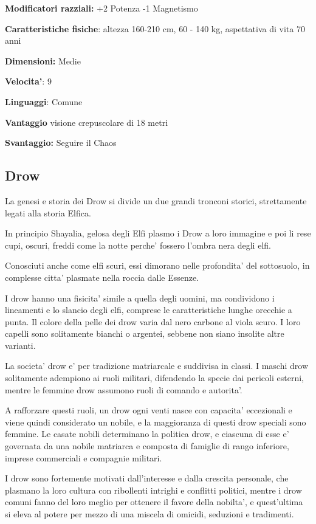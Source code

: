 \documentclass[a4paper,11pt,twoside,openany]{book}
\begin{document}
\textbf{Modificatori razziali:} +2 Potenza -1 Magnetismo

\textbf{Caratteristiche fisiche}: altezza 160-210 cm, 60 - 140 kg,
aspettativa di vita 70 anni

\textbf{Dimensioni:} Medie

\textbf{Velocita'}: 9

\textbf{Linguaggi}: Comune

\textbf{Vantaggio} visione crepuscolare di 18 metri

\textbf{Svantaggio:} Seguire il Chaos

\subsection{Drow}

\label{drow}

La genesi e storia dei Drow si divide un due grandi tronconi storici, strettamente legati alla storia Elfica.

In principio Shayalia, gelosa degli Elfi plasmo i Drow a loro immagine e poi li rese cupi, oscuri, freddi come la notte perche' fossero l'ombra nera degli elfi.

Conosciuti anche come elfi scuri, essi dimorano nelle profondita' del sottosuolo, in complesse citta' plasmate nella roccia dalle Essenze.

I drow hanno una fisicita' simile a quella degli uomini, ma condividono i lineamenti e lo slancio degli elfi, comprese le caratteristiche lunghe orecchie a punta. Il colore della pelle dei drow varia dal nero carbone al viola scuro. I loro capelli sono solitamente bianchi o argentei, sebbene non siano insolite altre varianti.

La societa' drow e' per tradizione matriarcale e suddivisa in classi. I maschi drow solitamente adempiono ai ruoli militari, difendendo la specie dai pericoli esterni, mentre le femmine drow assumono ruoli di comando e autorita'.

A rafforzare questi ruoli, un drow ogni venti nasce con capacita' eccezionali e viene quindi considerato un nobile, e la maggioranza di questi drow speciali sono femmine. Le casate nobili determinano la politica drow, e ciascuna di esse e' governata da una nobile matriarca e composta di famiglie di rango inferiore, imprese commerciali e compagnie militari.

I drow sono fortemente motivati dall'interesse e dalla crescita personale, che plasmano la loro cultura con ribollenti intrighi e conflitti politici, mentre i drow comuni fanno del loro meglio per ottenere il favore della nobilta', e quest'ultima si eleva al potere per mezzo di una miscela di omicidi, seduzioni e tradimenti.
\end{document}
